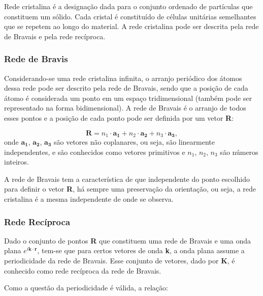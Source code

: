 \documentclass[11pt]{article}
\numberwithin{equation}{section}
\begin{document}
    \par Rede cristalina é a designação dada para o conjunto ordenado de partículas que constituem um sólido. Cada cristal é constituído de células unitárias semelhantes que se repetem ao longo do material. A rede cristalina pode ser descrita pela rede de Bravais e pela rede recíproca.\cite{qm_fis2}

    \subsubsection{Rede de Bravis}

      \par Considerando-se uma rede cristalina infinita, o arranjo periódico dos átomos dessa rede pode ser descrito pela rede de Bravais, sendo que a posição de cada átomo é considerada um ponto em um espaço tridimensional (também pode ser representado na forma bidimensional). A rede de Bravais é o arranjo de todos esses pontos e a posição de cada ponto pode ser definida por um vetor \textbf{R}: 

      \begin{equation}\label{redeBravis_eq1}
        \mathbf{R} = n_{1}\cdot \mathbf{a_{1}} + n_{2}\cdot \mathbf{a_{2}} + n_{3}\cdot \mathbf{a_{3}},
      \end{equation}
onde $\mathbf{a_{1}}$, $\mathbf{a_{2}}$, $\mathbf{a_{3}}$ são vetores não coplanares, ou seja, são linearmente independentes, e são conhecidos como vetores primitivos e $n_1$, $n_2$, $n_3$ são números inteiros.

      \par A rede de Bravais tem a característica de que independente do ponto escolhido para definir o vetor \textbf{R}, há sempre uma preservação da orientação, ou seja, a rede cristalina é a mesma independente de onde se observa. 

    \subsubsection{Rede Recíproca}

      \par Dado o conjunto de pontos \textbf{R} que constituem uma rede de Bravais e uma onda plana $e^{i \mathbf{k\cdot r}}$, tem-se que para certos vetores de onda \textbf{k}, a onda plana assume a periodicidade da rede de Bravais. Esse conjunto de vetores, dado por \textbf{K}, é conhecido como rede recíproca da rede de Bravais.  
      
      \par Como a questão da periodicidade é válida, a relação:
\end{document}
